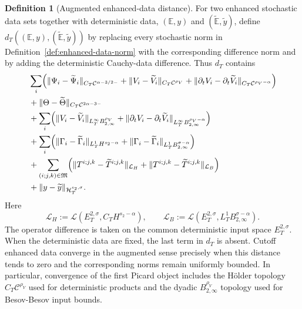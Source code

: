 \documentclass[10pt]{amsart}
\numberwithin{equation}{section}
\theoremstyle{plain}
\theoremstyle{definition}
\newtheorem{definition}[theorem]{Definition}
\theoremstyle{remark}
\newcommand{\C}{\mathcal{C}}
\newcommand{\Btwo}{B_{2,\infty}}
\begin{document}
\begin{definition}[Augmented enhanced-data distance]\label{def:enhanced-data-distance}
For two enhanced stochastic data sets together with deterministic data, $(\mathbb E,y)$ and $(\widetilde{\mathbb E},\widetilde y)$, define $d_T((\mathbb E,y),(\widetilde{\mathbb E},\widetilde y))$ by replacing every stochastic norm in Definition~\ref{def:enhanced-data-norm} with the corresponding difference norm and by adding the deterministic Cauchy-data difference.  Thus $d_T$ contains
\begin{align*}
&\sum_i\Bigl(
\|\Psi_i-\widetilde\Psi_i\|_{C_T\C^{\alpha-3/2-}}
+\|V_i-\widetilde V_i\|_{C_T\C^{\rho_V}}
+\|\partial_tV_i-\partial_t\widetilde V_i\|_{C_T\C^{\rho_V-\alpha}}
\Bigr)\\
&+\|\Theta-\widetilde\Theta\|_{C_T\C^{2\alpha-3-}}\\
&+\sum_i\Bigl(
\|V_i-\widetilde V_i\|_{L_T^\infty\Btwo^{\rho_V}}
+\|\partial_tV_i-\partial_t\widetilde V_i\|_{L_T^\infty\Btwo^{\rho_V-\alpha}}
\Bigr)\\
&+\sum_i\Bigl(
\|\Gamma_i-\widetilde\Gamma_i\|_{L_T^1H^{s_2-\alpha}}
+\|\Gamma_i-\widetilde\Gamma_i\|_{L_T^1\Btwo^{\sigma-\alpha}}\Bigr)\\
&+\sum_{(i;j,k)\in\mathfrak M}\Bigl(
\|T^{i;j,k}-\widetilde T^{i;j,k}\|_{\mathcal L_H}
+\|T^{i;j,k}-\widetilde T^{i;j,k}\|_{\mathcal L_B}
\Bigr)\\
&+\|y-\widetilde y\|_{\mathcal H_T^{s_2,\sigma}}.
\end{align*}
Here
\[
\mathcal L_H:=\mathcal L(E_T^{2,\sigma},C_TH^{s_2-\alpha}),\qquad
\mathcal L_B:=\mathcal L(E_T^{2,\sigma},L_T^1\Btwo^{\sigma-\alpha}).
\]
The operator difference is taken on the common deterministic input space $E_T^{2,\sigma}$.  When the deterministic data are fixed, the last term in $d_T$ is absent.  Cutoff enhanced data converge in the augmented sense precisely when this distance tends to zero and the corresponding norms remain uniformly bounded.  In particular, convergence of the first Picard object includes the H\"older topology $C_T\C^{\rho_V}$ used for deterministic products and the dyadic $B_{2,\infty}^{\rho_V}$ topology used for Besov-Besov input bounds.
\end{definition}
\end{document}
